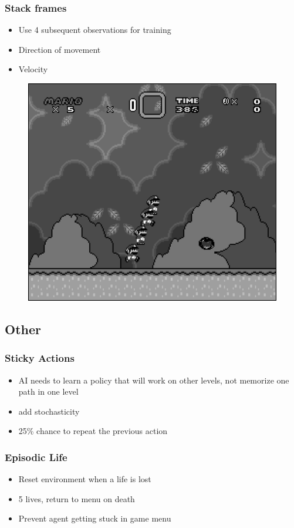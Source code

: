 \documentclass{article}
\begin{document}
    \subsubsection{Stack frames}
    \begin{itemize}
        \item Use 4 subsequent observations for training
        \item Direction of movement
        \item Velocity
    \end{itemize}
    \begin{figure}[H]
        \centering
        \includegraphics[width=.85\textwidth]{stacked}
    \end{figure}
    \subsection{Other}
    \subsubsection{Sticky Actions}
    \begin{itemize}
        \item AI needs to learn a policy that will work on other levels, not memorize one path in one level
        \item add stochasticity
        \item 25\% chance to repeat the previous action
    \end{itemize}
    \subsubsection{Episodic Life}
    \begin{itemize}
        \item Reset environment when a life is lost
        \item 5 lives, return to menu on death
        \item Prevent agent getting stuck in game menu
    \end{itemize}
\end{document}
